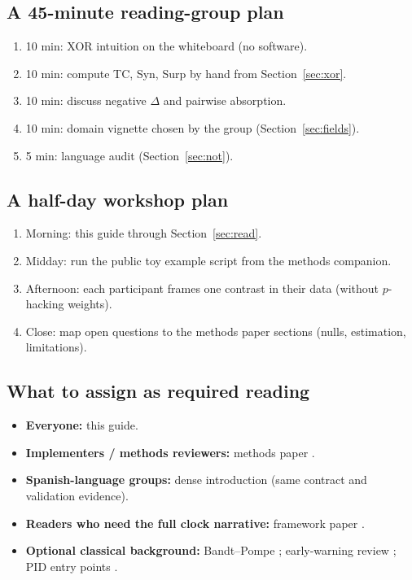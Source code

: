 \documentclass[11pt,a4paper]{article}
\begin{document}
\subsection{A 45-minute reading-group plan}

\begin{enumerate}[leftmargin=*,itemsep=2pt]
  \item 10 min: XOR intuition on the whiteboard (no software).
  \item 10 min: compute TC, Syn, Surp by hand from Section~\ref{sec:xor}.
  \item 10 min: discuss negative $\Delta$ and pairwise absorption.
  \item 10 min: domain vignette chosen by the group
  (Section~\ref{sec:fields}).
  \item 5 min: language audit (Section~\ref{sec:not}).
\end{enumerate}

\subsection{A half-day workshop plan}

\begin{enumerate}[leftmargin=*,itemsep=2pt]
  \item Morning: this guide through Section~\ref{sec:read}.
  \item Midday: run the public toy example script from the methods
  companion.
  \item Afternoon: each participant frames one contrast in their data
  (without $p$-hacking weights).
  \item Close: map open questions to the methods paper sections
  (nulls, estimation, limitations).
\end{enumerate}

\subsection{What to assign as required reading}

\begin{itemize}[leftmargin=*,itemsep=2pt]
  \item \textbf{Everyone:} this guide.
  \item \textbf{Implementers / methods reviewers:} methods paper
  \citep{Padilla2026excess3}.
  \item \textbf{Spanish-language groups:} dense introduction
  \citep{Padilla2026intro} (same contract and validation evidence).
  \item \textbf{Readers who need the full clock narrative:} framework
  paper \citep{Padilla2026framework}.
  \item \textbf{Optional classical background:} Bandt--Pompe
  \citep{BandtPompe2002}; early-warning review \citep{Scheffer2009}; PID
  entry points \citep{Williams2010,Timme2018}.
\end{itemize}
\end{document}
